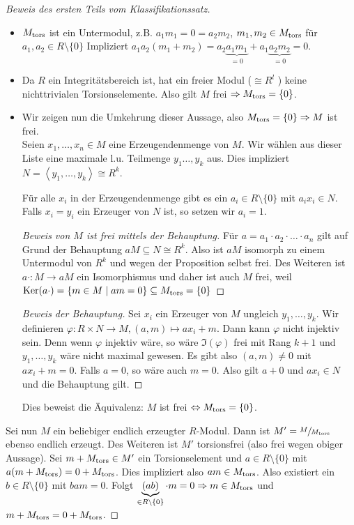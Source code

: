 \begin{proof}[Beweis des ersten Teils vom Klassifikationssatz] \leavevmode
	\begin{itemize}
		\item  $M_{\operatorname{tors}}$ ist ein Untermodul, z.B. $a_1 m_1  = 0 = a_2 m_2$, $m_1, m_2 \in M_{\operatorname{tors}}$ für $a_1,a_2 \in R \setminus \{0\} $ 
			Impliziert $a_1 a_2 (m_1 + m_2) = a_2 \underbrace{a_1 m_1}_{= 0} + a_1 \underbrace{a_2 m_2}_{= 0} = 0$.
		\item Da $R$ ein Integritätsbereich ist, hat ein freier Modul ($\cong R^{l}$ )  keine nichttrivialen Torsionselemente.
			Also gilt $M$ frei $\Rightarrow M_{\operatorname{tors}} = \{0\}$.
		\item Wir zeigen nun die Umkehrung dieser Aussage, also $M_{\operatorname{tors}} = \{0\} \Rightarrow M$ ist frei.\\
			Seien $x_1,\ldots,x_{n} \in M$ eine Erzeugendenmenge von $M$.
			Wir wählen aus dieser Liste eine maximale l.u. Teilmenge $y_1\ldots,y_{k}$ aus.
			Dies impliziert $N = \left< y_1,\ldots,y_{k} \right> \cong R^{k}$.
			\begin{claim}
				Für alle $x_{i}$ in der Erzeugendenmenge gibt es ein $a_{i} \in R \setminus \{0\} $ mit $a_{i} x_{i} \in N$.
				Falls $x_{i} = y_{i}$ ein Erzeuger von $N$ ist, so setzen wir $a_{i} = 1$. 
			\end{claim}
			\begin{proof}[Beweis von $M$ ist frei mittels der Behauptung]
				Für $a  = a_1 \cdot a_2 \cdot \ldots \cdot a_{n}$ gilt auf Grund der Behauptung $a M \subseteq N \cong R^{k}$.
				Also ist $a M$ isomorph zu einem Untermodul von $R^{k}$ und wegen der Proposition selbst frei.
				Des Weiteren ist $a \cdot : M \to aM$ ein Isomorphismus und daher ist auch $M$ frei,
				weil $\operatorname{Ker}(a\cdot ) = \{ m \in M \mid am = 0\} \subseteq M_{\operatorname{tors}} = \{0\} $
			\end{proof}

			\begin{proof}[Beweis der Behauptung]
				Sei $x_{i}$ ein Erzeuger von $M$ ungleich $y_1,\ldots,y_{k}$.
				Wir definieren $\varphi: R \times N \to M, (a,m) \mapsto a x_{i} + m$.
				Dann kann $\varphi$ nicht injektiv sein. Denn wenn $\varphi$ injektiv wäre, so wäre $\Im(\varphi)$ frei mit Rang $k+1$ 
				und $y_1,\ldots,y_{k}$ wäre nicht maximal gewesen. Es gibt also $(a,m) \neq 0$ mit $a x_{i} + m = 0$.
				Falls $a = 0$, so wäre auch $m = 0$.
				Also gilt $a+0$ und $a x_{i} \in N$ und die Behauptung gilt.
			\end{proof}
			Dies beweist die Äquivalenz: $M$ ist frei $\Leftrightarrow M_{\operatorname{tors}} = \{0\} $.
	\end{itemize}
	Sei nun $M$ ein beliebiger endlich erzeugter $R$-Modul. Dann ist  $M' = \sfrac{M}{M_{\operatorname{tors}}}$ ebenso endlich erzeugt.
	Des Weiteren ist $M'$ torsionsfrei (also frei wegen obiger Aussage).
	Sei $m + M_{\operatorname{tors}} \in M'$ ein Torsionselement und $a \in R \setminus \{0\} $ mit $a (m + M_{\operatorname{tors}}) = 0 + M_{\operatorname{tors}}$.
	Dies impliziert also $a m \in M_{\operatorname{tors}}$. Also existiert ein $b \in R \setminus \{0\} $ mit $b a m = 0$.
	Folgt $\underbrace{(ab)}_{\in R \setminus \{0\}} \cdot m = 0 \Rightarrow m \in M_{\operatorname{tors}}$ und $m + M_{\operatorname{tors}} = 0 + M_{\operatorname{tors}}$.


\end{proof}
